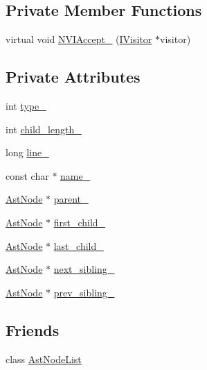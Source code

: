 \subsection*{Private Member Functions}
\begin{DoxyCompactItemize}
\item 
virtual void \hyperlink{classmocha_1_1_ast_node_a4a9c107bed3671f3fa15312b87f6ae96}{NVIAccept\_\-} (\hyperlink{classmocha_1_1_i_visitor}{IVisitor} $\ast$visitor)
\end{DoxyCompactItemize}
\subsection*{Private Attributes}
\begin{DoxyCompactItemize}
\item 
int \hyperlink{classmocha_1_1_ast_node_a59e9238b2db27f1e5ef1ccf81c93cd16}{type\_\-}
\item 
int \hyperlink{classmocha_1_1_ast_node_a033534382c7c396910db4b1d3ec17941}{child\_\-length\_\-}
\item 
long \hyperlink{classmocha_1_1_ast_node_a3ab61c0ef95a24a3577d0b35222cd100}{line\_\-}
\item 
const char $\ast$ \hyperlink{classmocha_1_1_ast_node_a876b49852a3151d977c842a90ee02771}{name\_\-}
\item 
\hyperlink{classmocha_1_1_ast_node}{AstNode} $\ast$ \hyperlink{classmocha_1_1_ast_node_a0e54d89150bb432e02a4b5d7be77b123}{parent\_\-}
\item 
\hyperlink{classmocha_1_1_ast_node}{AstNode} $\ast$ \hyperlink{classmocha_1_1_ast_node_a68b1845416afaf64d92dca6f7e3bc8b3}{first\_\-child\_\-}
\item 
\hyperlink{classmocha_1_1_ast_node}{AstNode} $\ast$ \hyperlink{classmocha_1_1_ast_node_ab86de84c3ad18dac8f5dcf773baba73b}{last\_\-child\_\-}
\item 
\hyperlink{classmocha_1_1_ast_node}{AstNode} $\ast$ \hyperlink{classmocha_1_1_ast_node_a20376498021723661925c094ec358ffa}{next\_\-sibling\_\-}
\item 
\hyperlink{classmocha_1_1_ast_node}{AstNode} $\ast$ \hyperlink{classmocha_1_1_ast_node_abcf6ff00015261ce21a4ce6e7dfe9e1d}{prev\_\-sibling\_\-}
\end{DoxyCompactItemize}
\subsection*{Friends}
\begin{DoxyCompactItemize}
\item 
class \hyperlink{classmocha_1_1_ast_node_aa66849357775a8f6a77cb82678fa1d24}{AstNodeList}
\end{DoxyCompactItemize}


